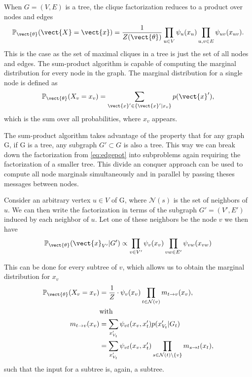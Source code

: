 When $G=(V,E)$ is a tree, the clique factorization reduces to a product over nodes and edges
\begin{equation}
    \label{eq:edgepot}
    \mathbb{P}_{\vect{\theta}}(\vect{X} = \vect{x}) = \frac{1}{Z(\vect{\theta})} \prod_{u\in V} \psi_u(x_u) \prod_{u,v \in E} \psi_{uv}(x_{uv}).
\end{equation}
This is the case as the set of maximal cliques in a tree is just the set of all nodes and edges.
The sum-product algorithm is capable of computing the marginal distribution for every node in the graph.
The marginal distribution for a single node is defined as
\begin{equation}
    \mathbb{P}_{\vect{\theta}}(X_v = x_v) = \sum_{\vect{x}' \in \{\vect{x}' \lvert x_v\}} p(\vect{x}'),
\end{equation}
which is the sum over all probabilities, where $x_v$ appears.

The sum-product algorithm takes advantage of the property that for any graph G, if G is a tree, any subgraph $G' \subset G$ is also a tree. 
This way we can break down the factorization from \eq\ref{eq:edgepot} into subproblems again requiring the factorization of a smaller tree.
This divide an conquer approach can be used to compute all node marginals simultaneously and in parallel by passing theses messages between nodes.


Consider an arbitrary vertex $u \in V$ of G, where $\mathcal{N}(s)$ is the set of neighbors of $u$.
We can then write the factorization in terms of the subgraph $G'=(V', E')$ induced by each neighbor of $u$. 
Let one of these neighbors be the node $v$ we then have 
\begin{equation}
    \mathbb{P}_{\vect{\theta}}(\vect{x}_{V'}\lvert G') \propto \prod_{v \in V'} \psi_v(x_v) \prod_{vw \in E'} \psi_{vw}(x_{vw})
\end{equation}

This can be done for every subtree of $v$, which allows us to obtain the marginal distribution for $x_v$
\begin{equation}
    \label{eq:normbp}
    \begin{split}
    \mathbb{P}_{\vect{\theta}}(X_v = x_v) &= \frac{1}{Z} \cdot \psi_v(x_v) \prod_{t \in \mathcal{N}(v)} m_{t \rightarrow v}(x_v),  \\
    & \text{with}\\
    m_{t \rightarrow v}(x_v) &= \sum_{x'_{V_t}} \psi_{vt}(x_v, x_t') p(x'_{V_t} \lvert G_t) \\
    & = \sum_{x'_{V_t}} \psi_{vt}(x_v, x_t')  \prod_{s\in \mathcal{N}(t) \setminus \{v\}} m_{s \rightarrow t}(x_t),
    \end{split}
\end{equation}
such that the input for a subtree is, again, a subtree.

